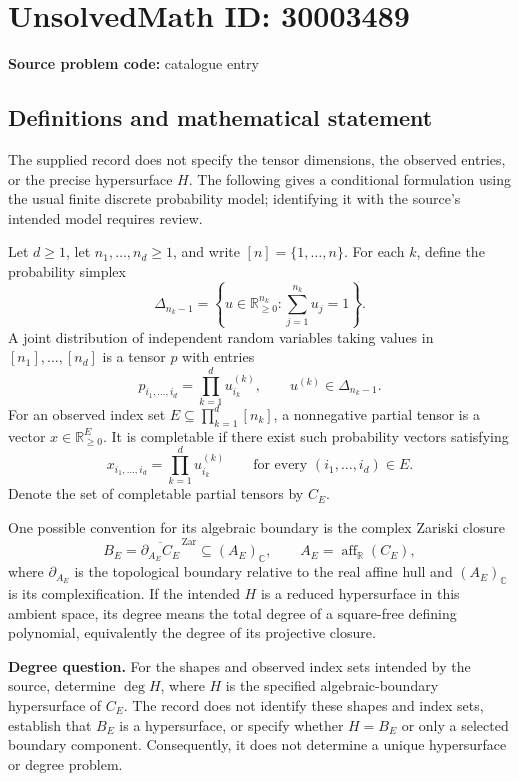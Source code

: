 \documentclass[11pt]{article}
\newcommand{\R}{\mathbb{R}}
\newcommand{\C}{\mathbb{C}}
\begin{document}
\section*{UnsolvedMath ID: 30003489}
\textbf{Source problem code:} catalogue entry
\subsection{Definitions and mathematical statement}
The supplied record does not specify the tensor dimensions, the observed entries, or the precise hypersurface \(H\). The following gives a conditional formulation using the usual finite discrete probability model; identifying it with the source's intended model requires review.

Let \(d\geq 1\), let \(n_1,\ldots,n_d\geq 1\), and write \([n]=\{1,\ldots,n\}\). For each \(k\), define the probability simplex
\[
\Delta_{n_k-1}=\left\{u\in\R_{\geq0}^{n_k}:\sum_{j=1}^{n_k}u_j=1\right\}.
\]
A joint distribution of independent random variables taking values in \([n_1],\ldots,[n_d]\) is a tensor \(p\) with entries
\[
p_{i_1,\ldots,i_d}=\prod_{k=1}^{d}u^{(k)}_{i_k},\qquad u^{(k)}\in\Delta_{n_k-1}.
\]
For an observed index set \(E\subseteq\prod_{k=1}^{d}[n_k]\), a nonnegative partial tensor is a vector \(x\in\R_{\geq0}^{E}\). It is completable if there exist such probability vectors satisfying
\[
x_{i_1,\ldots,i_d}=\prod_{k=1}^{d}u^{(k)}_{i_k}\qquad\text{for every }(i_1,\ldots,i_d)\in E.
\]
Denote the set of completable partial tensors by \(C_E\).

One possible convention for its algebraic boundary is the complex Zariski closure
\[
B_E=\overline{\partial_{A_E}C_E}^{\,\mathrm{Zar}}\subseteq (A_E)_{\C},\qquad A_E=\operatorname{aff}_{\R}(C_E),
\]
where \(\partial_{A_E}\) is the topological boundary relative to the real affine hull and \((A_E)_{\C}\) is its complexification. If the intended \(H\) is a reduced hypersurface in this ambient space, its degree means the total degree of a square-free defining polynomial, equivalently the degree of its projective closure.

\textbf{Degree question.} For the shapes and observed index sets intended by the source, determine \(\deg H\), where \(H\) is the specified algebraic-boundary hypersurface of \(C_E\). The record does not identify these shapes and index sets, establish that \(B_E\) is a hypersurface, or specify whether \(H=B_E\) or only a selected boundary component. Consequently, it does not determine a unique hypersurface or degree problem.
\end{document}
